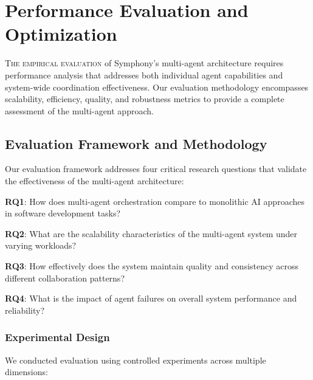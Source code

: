 
\section*{Performance Evaluation and Optimization}

\lettrine{T}{he empirical evaluation} of Symphony's multi-agent architecture requires performance analysis that addresses both individual agent capabilities and system-wide coordination effectiveness. Our evaluation methodology encompasses scalability, efficiency, quality, and robustness metrics to provide a complete assessment of the multi-agent approach.

\subsection*{Evaluation Framework and Methodology}

Our evaluation framework addresses four critical research questions that validate the effectiveness of the multi-agent architecture:

\begin{expandedlist}
    \item \textbf{RQ1}: How does multi-agent orchestration compare to monolithic AI approaches in software development tasks?
    \item \textbf{RQ2}: What are the scalability characteristics of the multi-agent system under varying workloads?
    \item \textbf{RQ3}: How effectively does the system maintain quality and consistency across different collaboration patterns?
    \item \textbf{RQ4}: What is the impact of agent failures on overall system performance and reliability?
\end{expandedlist}

\subsubsection*{Experimental Design}

We conducted evaluation using controlled experiments across multiple dimensions:

